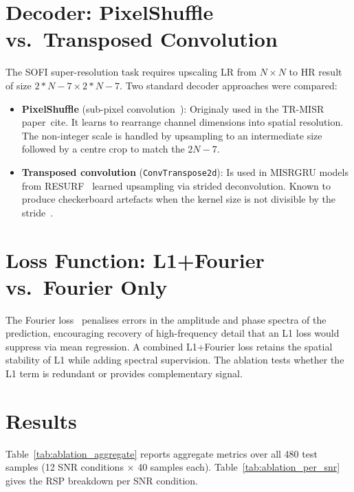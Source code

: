 \section{Decoder: PixelShuffle vs.\ Transposed Convolution}
\label{app:decoder_ablation}

The SOFI super-resolution task requires upscaling LR from $N \times N$ to HR result of size 
$2*N-7 \times 2*N-7$.
Two standard decoder approaches were compared:

\begin{itemize}
  \item \textbf{PixelShuffle} (sub-pixel convolution~\cite{shi2016pixelshuffle}):
   Originaly used in the TR-MISR paper~cite\cite{TR-MISR-original}. It learns
    to rearrange channel dimensions into spatial resolution. The non-integer scale is handled
    by upsampling to an intermediate size followed by a centre crop to match the $2N-7$.
  \item \textbf{Transposed convolution} (\texttt{ConvTranspose2d}): Is used in MISRGRU models from 
  RESURF~\cite{resurf2024} learned upsampling via
    strided deconvolution. Known to produce checkerboard artefacts when the kernel size is
    not divisible by the stride~\cite{odena2016deconvolution}.
\end{itemize}

\section{Loss Function: L1+Fourier vs.\ Fourier Only}
\label{app:loss_ablation}

The Fourier loss~\cite{resurf2024} penalises errors in the amplitude and phase spectra of
the prediction, encouraging recovery of high-frequency detail that an L1 loss would
suppress via mean regression. A combined L1+Fourier loss retains the spatial stability of
L1 while adding spectral supervision. The ablation tests whether the L1 term is redundant
or provides complementary signal.

\section{Results}
\label{app:ablation_results}

Table~\ref{tab:ablation_aggregate} reports aggregate metrics over all 480 test samples
(12 SNR conditions $\times$ 40 samples each). Table~\ref{tab:ablation_per_snr} gives
the RSP breakdown per SNR condition.

